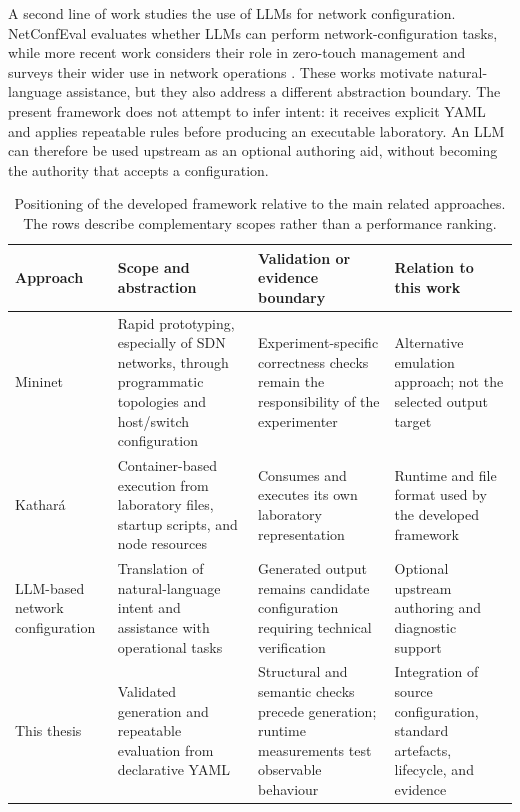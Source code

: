 A second line of work studies the use of LLMs for network configuration.
NetConfEval evaluates whether LLMs can perform network-configuration tasks,
while more recent work considers their role in zero-touch management and
surveys their wider use in network operations
\cite{wang2024netconfeval,lira2025llmnetcfg,liu2025llmnetworking}. These works
motivate natural-language assistance, but they also address a different
abstraction boundary. The present framework does not attempt to infer intent:
it receives explicit YAML and applies repeatable rules before producing an
executable laboratory. An LLM can therefore be used upstream as an optional
authoring aid, without becoming the authority that accepts a configuration.

\begin{table}[htbp]
\centering
\small
\setlength{\tabcolsep}{4pt}
\begin{tabular}{>{\raggedright\arraybackslash}p{}>{\raggedright\arraybackslash}p{}>{\raggedright\arraybackslash}p{}>{\raggedright\arraybackslash}p{}}
\toprule
\textbf{Approach} & \textbf{Scope and abstraction} & \textbf{Validation or evidence boundary} & \textbf{Relation to this work} \\
\midrule
Mininet \cite{lantz2010network} & Rapid prototyping, especially of SDN networks, through programmatic topologies and host/switch configuration & Experiment-specific correctness checks remain the responsibility of the experimenter & Alternative emulation approach; not the selected output target \\
Kathar\'a \cite{bonofiglio2018kathara,scazzariello2020kathara} & Container-based execution from laboratory files, startup scripts, and node resources & Consumes and executes its own laboratory representation & Runtime and file format used by the developed framework \\
LLM-based network configuration \cite{wang2024netconfeval,lira2025llmnetcfg,liu2025llmnetworking} & Translation of natural-language intent and assistance with operational tasks & Generated output remains candidate configuration requiring technical verification & Optional upstream authoring and diagnostic support \\
This thesis & Validated generation and repeatable evaluation from declarative YAML & Structural and semantic checks precede generation; runtime measurements test observable behaviour & Integration of source configuration, standard artefacts, lifecycle, and evidence \\
\bottomrule
\end{tabular}
\caption{Positioning of the developed framework relative to the main related approaches. The rows describe complementary scopes rather than a performance ranking.}
\label{tab:related-work-positioning}
\end{table}

